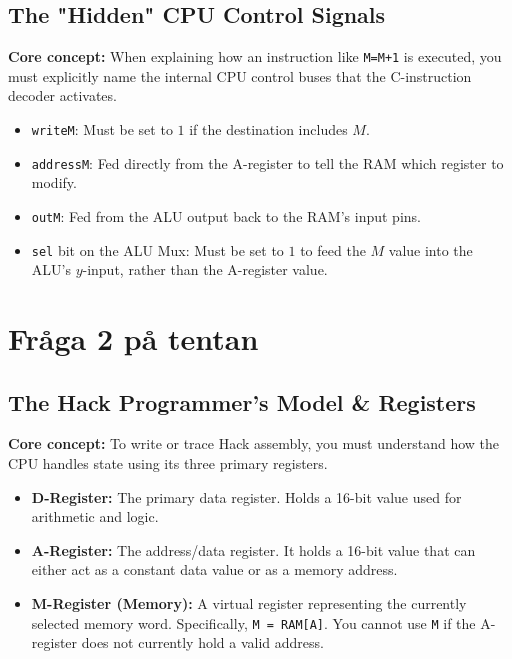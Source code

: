 \documentclass[12pt,a4paper]{article}
\begin{document}
\subsection{The "Hidden" CPU Control Signals}
\textbf{Core concept:} When explaining how an instruction like \texttt{M=M+1} is executed, you must explicitly name the internal CPU control buses that the C-instruction decoder activates.
\begin{itemize}
    \item \texttt{writeM}: Must be set to $1$ if the destination includes $M$.
    \item \texttt{addressM}: Fed directly from the A-register to tell the RAM which register to modify.
    \item \texttt{outM}: Fed from the ALU output back to the RAM's input pins.
    \item \texttt{sel} bit on the ALU Mux: Must be set to $1$ to feed the $M$ value into the ALU's $y$-input, rather than the A-register value.
\end{itemize}

\newpage
\section{Fråga 2 på tentan}
\subsection{The Hack Programmer's Model \& Registers}
\textbf{Core concept:} To write or trace Hack assembly, you must understand how the CPU handles state using its three primary registers.
\begin{itemize}
    \item \textbf{D-Register:} The primary data register. Holds a 16-bit value used for arithmetic and logic.
    \item \textbf{A-Register:} The address/data register. It holds a 16-bit value that can either act as a constant data value or as a memory address.
    \item \textbf{M-Register (Memory):} A virtual register representing the currently selected memory word. Specifically, \texttt{M = RAM[A]}. You cannot use \texttt{M} if the A-register does not currently hold a valid address.
\end{itemize}
\end{document}
